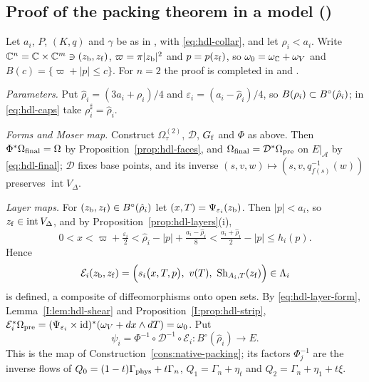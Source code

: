 \subsection{Proof of the packing theorem in a model ()}\label{sec:hdl-proof}

Let $a_i$, $P$, $(K,q)$ and $\gamma$ be as in , with \eqref{eq:hdl-collar}, and let $\rho_i<a_i$. Write $\mathbb{C}^n=\mathbb{C}\times\mathbb{C}^m\ni(z_{\rm b},z_{\rm f})$, $\varpi=\pi|z_{\rm b}|^2$ and $p=p(z_{\rm f})$, so $\omega_0=\omega_{\mathbb{C}}+\omega_V$ and $B(c)=\{\varpi+|p|\le c\}$. For $n=2$ the proof is completed in  and .

\emph{Parameters.} Put $\hat\rho_i=(3a_i+\rho_i)/4$ and $\varepsilon_i=(a_i-\hat\rho_i)/4$, so $B(\rho_i)\subset B^{\circ}(\hat\rho_i)$; in \eqref{eq:hdl-caps} take $\rho_i^\sharp=\hat\rho_i$.

\emph{Forms and Moser map.} Construct $\Omega^{(2)}_\tau$, $\mathcal D$, $G_{\rm f}$ and $\Phi$ as above. Then $\Phi^*\Omega_{\rm final}=\Omega$ by Proposition~\ref{prop:hdl-faces}, and $\Omega_{\rm final}=\mathcal D^*\Omega_{\rm pre}$ on $E|_{\mathcal A}$ by \eqref{eq:hdl-final}; $\mathcal D$ fixes base points, and its inverse $(s,v,w)\mapsto(s,v,q_{f(s)}^{-1}(w))$ preserves $\operatorname{int}V_\Delta$.

\emph{Layer maps.} For $(z_{\rm b},z_{\rm f})\in B^\circ(\hat\rho_i)$ let $(x,T)=\Psi_{\varepsilon_i}(z_{\rm b})$. Then $|p|<a_i$, so $z_{\rm f}\in\operatorname{int}V_\Delta$, and by Proposition~\ref{prop:hdl-layers}(i),
\[
0<x<\varpi+\tfrac{\varepsilon_i}2<\hat\rho_i-|p|+\tfrac{a_i-\hat\rho_i}{8}<\tfrac{a_i+\hat\rho_i}{2}-|p|\le h_i(p).
\]
Hence
\[
 \mathcal E_i(z_{\rm b},z_{\rm f})=\Big(s_i\big(x,T,p\big),\ v(T),\ \mathrm{Sh}_{A_i,T}(z_{\rm f})\Big)\in\Lambda_i
\]
is defined, a composite of diffeomorphisms onto open sets. By \eqref{eq:hdl-layer-form}, Lemma~\ref{I:lem:hdl-shear} and Proposition~\ref{I:prop:hdl-strip}, $\mathcal E_i^*\Omega_{\rm pre}=(\Psi_{\varepsilon_i}\times\mathrm{id})^*(\omega_V+dx\wedge dT)=\omega_0$. Put
\[
 \psi_i=\Phi^{-1}\circ\mathcal D^{-1}\circ\mathcal E_i\colon B^\circ(\hat\rho_i)\to E .
\]
This is the map of Construction~\ref{cons:native-packing}; its factors $\Phi_j^{-1}$ are the inverse flows of $Q_0=(1-t)\Gamma_{\rm phys}+t\Gamma_n$, $Q_1=\Gamma_n+\eta_t$ and $Q_2=\Gamma_n+\eta_1+t\xi$.

